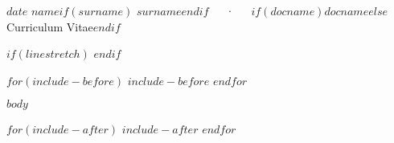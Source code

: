 \documentclass[11pt, a4paper]{awesome-cv}
\begin{document}
\makecvheader

\makecvfooter
  {$date$}
    {$name$$if(surname)$ $surname$$endif$~~~·~~~$if(docname)$$docname$$else$Curriculum Vitae$endif$}
  {\thepage}



$if(linestretch)$
$endif$

$for(include-before)$
$include-before$
$endfor$

$body$

$for(include-after)$
$include-after$
$endfor$
\end{document}
